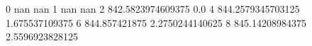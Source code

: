 0 nan nan
1 nan nan
2 842.5823974609375 0.0
4 844.2579345703125 1.675537109375
6 844.857421875 2.2750244140625
8 845.14208984375 2.5596923828125
